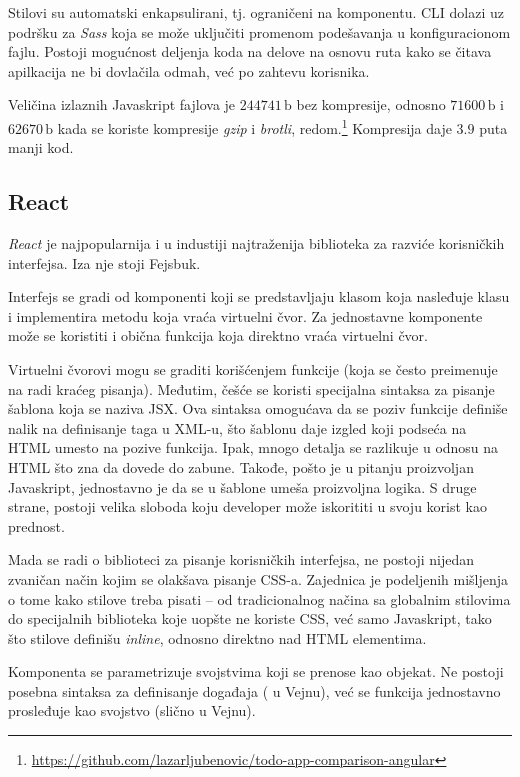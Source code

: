 Stilovi su automatski enkapsulirani, tj. ograničeni na komponentu.
CLI dolazi uz podršku za \textsl{Sass} koja se može uključiti promenom podešavanja u konfiguracionom fajlu.
Postoji mogućnost deljenja koda na delove na osnovu ruta kako se čitava apilkacija ne bi dovlačila odmah, već po zahtevu korisnika.

Veličina izlaznih Javaskript fajlova je $244741\,\mathrm{b}$ bez kompresije, odnosno $71600\,\mathrm{b}$ i $62670\,\mathrm{b}$ kada se koriste kompresije \textsl{gzip} i \textsl{brotli}, redom.\footnote{\url{https://github.com/lazarljubenovic/todo-app-comparison-angular}} Kompresija daje $3.9$ puta manji kod.

\subsection{React}

\textsl{React} je najpopularnija i u industiji najtraženija biblioteka za razviće korisničkih interfejsa.
Iza nje stoji Fejsbuk.

Interfejs se gradi od komponenti koji se predstavljaju klasom koja nasleđuje klasu  i implementira metodu  koja vraća virtuelni čvor.
Za jednostavne komponente može se koristiti i obična funkcija koja direktno vraća virtuelni čvor.

Virtuelni čvorovi mogu se graditi korišćenjem funkcije  (koja se često preimenuje na  radi kraćeg pisanja).
Međutim, češće se koristi specijalna sintaksa za pisanje šablona koja se naziva JSX.
Ova sintaksa omogućava da se poziv funkcije definiše nalik na definisanje taga u XML-u, što šablonu daje izgled koji podseća na HTML umesto na pozive funkcija.
Ipak, mnogo detalja se razlikuje u odnosu na HTML što zna da dovede do zabune.
Takođe, pošto je u pitanju proizvoljan Javaskript, jednostavno je da se u šablone umeša proizvoljna logika.
S druge strane, postoji velika sloboda koju developer može iskorititi u svoju korist kao prednost.

Mada se radi o biblioteci za pisanje korisničkih interfejsa, ne postoji nijedan zvaničan način kojim se olakšava pisanje CSS-a.
Zajednica je podeljenih mišljenja o tome kako stilove treba pisati -- od tradicionalnog načina sa globalnim stilovima do specijalnih biblioteka koje uopšte ne koriste CSS, već samo Javaskript, tako što stilove definišu \textit{inline}, odnosno direktno nad HTML elementima.

Komponenta se parametrizuje svojstvima koji se prenose kao objekat.
Ne postoji posebna sintaksa za definisanje događaja ( u Vejnu), već se funkcija jednostavno prosleđuje kao svojstvo (slično  u Vejnu).

